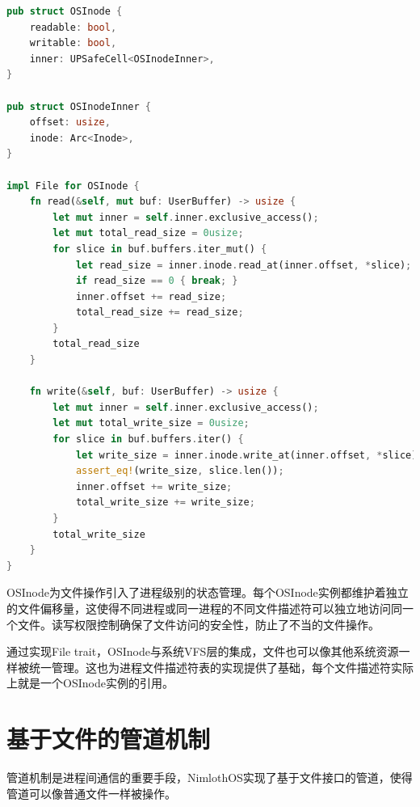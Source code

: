 \begin{lstlisting}[language=Rust]
pub struct OSInode {
    readable: bool,
    writable: bool,
    inner: UPSafeCell<OSInodeInner>,
}

pub struct OSInodeInner {
    offset: usize,
    inode: Arc<Inode>,
}

impl File for OSInode {
    fn read(&self, mut buf: UserBuffer) -> usize {
        let mut inner = self.inner.exclusive_access();
        let mut total_read_size = 0usize;
        for slice in buf.buffers.iter_mut() {
            let read_size = inner.inode.read_at(inner.offset, *slice);
            if read_size == 0 { break; }
            inner.offset += read_size;
            total_read_size += read_size;
        }
        total_read_size
    }

    fn write(&self, buf: UserBuffer) -> usize {
        let mut inner = self.inner.exclusive_access();
        let mut total_write_size = 0usize;
        for slice in buf.buffers.iter() {
            let write_size = inner.inode.write_at(inner.offset, *slice);
            assert_eq!(write_size, slice.len());
            inner.offset += write_size;
            total_write_size += write_size;
        }
        total_write_size
    }
}
\end{lstlisting}

OSInode为文件操作引入了进程级别的状态管理。每个OSInode实例都维护着独立的文件偏移量，这使得不同进程或同一进程的不同文件描述符可以独立地访问同一个文件。读写权限控制确保了文件访问的安全性，防止了不当的文件操作。

通过实现File trait，OSInode与系统VFS层的集成，文件也可以像其他系统资源一样被统一管理。这也为进程文件描述符表的实现提供了基础，每个文件描述符实际上就是一个OSInode实例的引用。

\section{基于文件的管道机制}

管道机制是进程间通信的重要手段，NimlothOS实现了基于文件接口的管道，使得管道可以像普通文件一样被操作。


